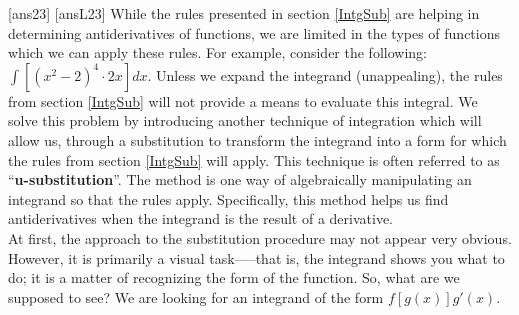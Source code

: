 \newpage
[ans23]
[ansL23]
\noindent While the rules presented in section \ref{IntgSub} are helping in determining antiderivatives of functions, we are limited in the types of functions which we can apply these rules.  For example, consider the following: $\displaystyle\int \left[(x^2-2)^4\cdot 2x\right] dx$. Unless we expand the integrand (unappealing), the rules from section \ref{IntgSub} will not provide a means to evaluate this integral.  We solve this problem by introducing another technique of integration which will allow us, through a substitution to transform the integrand into a form for which the rules from section \ref{IntgSub} will apply.  This technique is often referred to as “\textbf{u-substitution}”.   The method is one way of algebraically manipulating an integrand so that the rules apply. Specifically, this method helps us find antiderivatives when the integrand is the result of a  derivative.\\

\noindent At first, the approach to the substitution procedure may not appear very obvious. However, it is primarily a visual task—--that is, the integrand shows you what to do; it is a matter of recognizing the form of the function. So, what are we supposed to see? We are looking for an integrand of the form $f[g(x)]g'(x)$. \\

